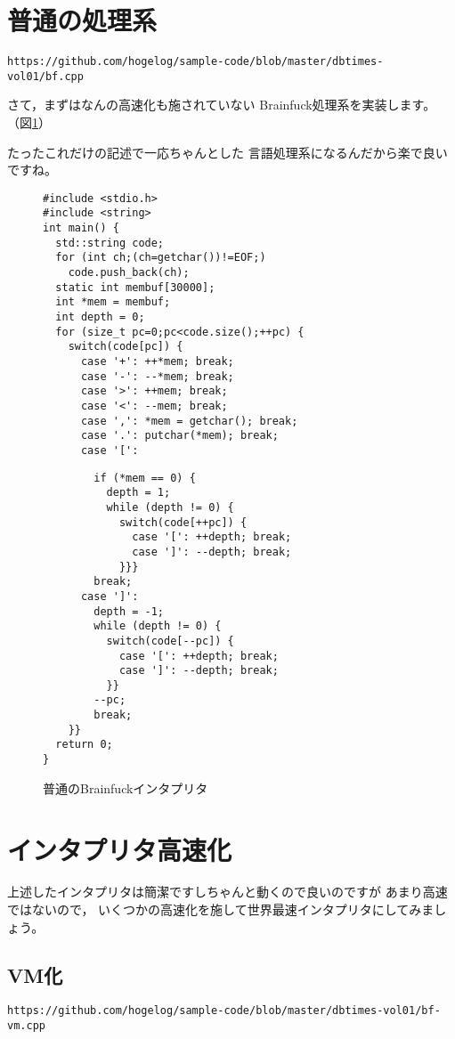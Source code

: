 \section{普通の処理系}
{\scriptsize
\verb|https://github.com/hogelog/sample-code/blob/master/dbtimes-vol01/bf.cpp|
}

さて，まずはなんの高速化も施されていない
Brainfuck処理系を実装します。
（図\ref{bf.cpp}）

たったこれだけの記述で一応ちゃんとした
言語処理系になるんだから楽で良いですね。

\begin{figure}[hbt]
\begin{minipage}{0.5\hsize}
{\scriptsize
\begin{verbatim}
#include <stdio.h>
#include <string>
int main() {
  std::string code;
  for (int ch;(ch=getchar())!=EOF;)
    code.push_back(ch);
  static int membuf[30000];
  int *mem = membuf;
  int depth = 0;
  for (size_t pc=0;pc<code.size();++pc) {
    switch(code[pc]) {
      case '+': ++*mem; break;
      case '-': --*mem; break;
      case '>': ++mem; break;
      case '<': --mem; break;
      case ',': *mem = getchar(); break;
      case '.': putchar(*mem); break;
      case '[':
\end{verbatim}
}
\end{minipage}
\begin{minipage}{0.5\hsize}
{\scriptsize
\begin{verbatim}
        if (*mem == 0) {
          depth = 1;
          while (depth != 0) {
            switch(code[++pc]) {
              case '[': ++depth; break;
              case ']': --depth; break;
            }}}
        break;
      case ']':
        depth = -1;
        while (depth != 0) {
          switch(code[--pc]) {
            case '[': ++depth; break;
            case ']': --depth; break;
          }}
        --pc;
        break;
    }}
  return 0;
}
\end{verbatim}
}
\end{minipage}
\caption{
普通のBrainfuckインタプリタ
}
\label{bf.cpp}
\end{figure}

\section{インタプリタ高速化}
上述したインタプリタは簡潔ですしちゃんと動くので良いのですが
あまり高速ではないので，
いくつかの高速化を施して世界最速インタプリタにしてみましょう。

\subsection{VM化}
{\scriptsize
\verb|https://github.com/hogelog/sample-code/blob/master/dbtimes-vol01/bf-vm.cpp|
}

